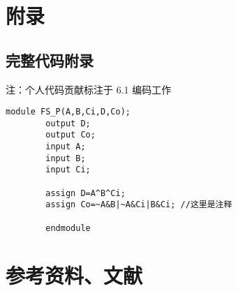 
\section{附录}

\subsection{完整代码附录}
注：个人代码贡献标注于 6.1 编码工作
  \begin{lstlisting}[style=verilog, title=\texttt{示例}, basicstyle=\zihao{-4}\ttfamily]
		module FS_P(A,B,Ci,D,Co);
		output D;
		output Co;
		input A;
		input B;
		input Ci;
	
		assign D=A^B^Ci;
		assign Co=~A&B|~A&Ci|B&Ci; //这里是注释

		endmodule	
	\end{lstlisting}
\section{参考资料、文献}

